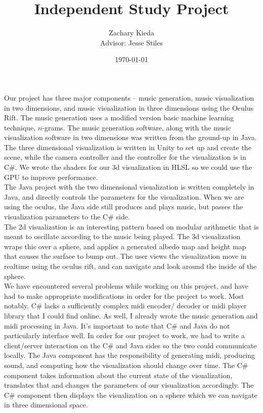 \documentclass[11pt]{article}
\title{Independent Study Project}
\author{Zachary Kieda\\{Advisor: Jesse Stiles}}
\date{\today}
\begin{document}
\maketitle

Our project has three major components -- music generation, music visualization in two dimensions, and music visualization in three dimensions using the Oculus Rift. The music generation uses a modified version basic machine learning technique, $n$-grams. The music generation software, along with the music visualization software in two dimensions was written from the ground-up in Java. The three dimensional visualization is written in Unity to set up and create the scene, while the camera controller and the controller for the visualization is in C\#. We wrote the shaders for our 3d visualization in HLSL so we could use the GPU to improve performance.\\

The Java project with the two dimensional visualization is written completely in Java, and directly controls the parameters for the visualization. When we are using the oculus, the Java side still produces and plays music, but passes the visualization parameters to the C\# side.\\

The 2d visualization is an interesting pattern based on modular arithmetic that is meant to oscillate according to the music being played. The 3d visualization wraps this over a sphere, and applies a generated albedo map and height map that causes the surface to bump out. The user views the visualization move in realtime using the oculus rift, and can navigate and look around the inside of the sphere.\\

We have encountered several problems while working on this project, and have had to make appropriate modifications in order for the project to work. Most notably, C\# lacks a sufficiently complex midi encoder/ decoder or midi player library that I could find online. As well, I already wrote the music generation and midi processing in Java. It's important to note that C\# and Java do not particularly interface well. In order for our project to work, we had to write a client/server interaction on the C\# and Java sides so the two could communicate locally. The Java component has the responsibility of generating midi, producing sound, and computing how the visualization should change over time. The C\# component takes information about the current state of the visualization, translates that and changes the parameters of our visualization accordingly. The C\# component then displays the visualization on a sphere which we can navigate in three dimensional space. \\
\end{document}

